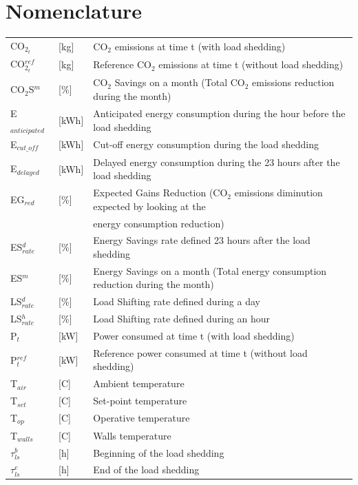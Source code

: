 \documentclass[buildings,article,submit,moreauthors,pdftex,10pt,a4paper]{mdpi}
\theoremstyle{mdpi}
\newcounter{ex}
\newcounter{re}
\theoremstyle{mdpidefinition}
\begin{document}
\section*{Nomenclature}
\noindent
        \small
         \begin{tabular}[H]{lll}	%
              CO$_{{2}_{t}}$ & [kg] & CO$_{2}$ emissions at time t (with load shedding) \\
             CO$_{{2}_{t}}^{ref}$ & [kg] & Reference CO$_{2}$ emissions at time t (without load shedding) \\
             CO$_{2}$S$^{m}$ & [\%] & CO$_{2}$ Savings on a month (Total CO$_{2}$ emissions reduction during the month) \\
             E$_{anticipated}$ &	[kWh]	& Anticipated energy consumption during the hour before the load shedding \\
             E$_{cut\_off}$  &	[kWh]	& Cut-off energy consumption during the load shedding \\
             E$_{delayed}$ 	& [kWh]	& Delayed energy consumption during the 23 hours after  the load shedding  \\
             EG$_{red}$ &  [\%]  & Expected Gains Reduction (CO$_2$ emissions diminution expected by looking at the  \\
             &&energy consumption reduction) \\
             ES$_{rate}^{d}$ &[\%]	& Energy Savings rate defined 23 hours after the load shedding \\
             ES$^{m}$ & [\%] &  Energy Savings on a month (Total energy consumption reduction during the month) \\
             LS$_{rate}^{d}$ & [\%]		& Load Shifting rate defined during a day \\
             LS$_{rate}^{h}$ & [\%]	& Load Shifting rate defined during an hour \\
             P$_{t}$& [kW] & Power consumed at time t (with load shedding)\\
             P$_{t}^{ref}$& [kW]& Reference power consumed at time t (without load shedding) \\
             T$_{air}$ 	&[\textdegree{}C]	& Ambient temperature  \\
             T$_{set}$ 	& [\textdegree{}C]	& Set-point temperature \\
             T$_{op}$ &	[\textdegree{}C]	& Operative temperature \\
             T$_{walls}$ &[\textdegree{}C]	& Walls temperature \\
             $\tau_{ls}^{b}$ & [h] & Beginning of the load shedding \\
             $\tau_{ls}^{e}$ & [h] & End of the load shedding\\
         \end{tabular}
         
\end{document}
